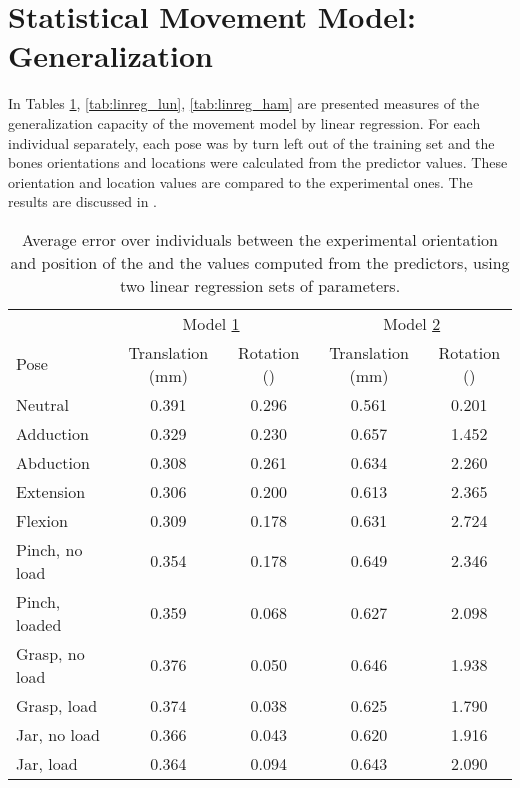\section{Statistical Movement Model: Generalization}
\label{appendix:movement_model_generalization}


In Tables \ref{tab:linreg_mc3}, \ref{tab:linreg_lun}, \ref{tab:linreg_ham} are presented measures of the generalization capacity of the movement model by linear regression. For each individual separately, each pose was by turn left out of the training set and the bones orientations and locations were calculated from the predictor values. These orientation and location values are compared to the experimental ones. The results are discussed in .

\begin{table}[!ht]
	\centering
	\begin{tabular}{lcc|cc}
		\toprule
		\mct*	& \multicolumn{2}{c}{Model \hyperref[model1]{1}} & \multicolumn{2}{c}{Model \hyperref[model2]{2}} \\
		Pose & Translation (mm) & Rotation (\degre) & Translation (mm) & Rotation (\degre) \\
		\midrule
		Neutral 		 & 0.391 	 & 0.296 	 & 0.561 	 & 0.201 \\
		Adduction 		 & 0.329 	 & 0.230 	 & 0.657 	 & 1.452 \\
		Abduction 		 & 0.308 	 & 0.261 	 & 0.634 	 & 2.260 \\
		Extension 		 & 0.306 	 & 0.200 	 & 0.613 	 & 2.365 \\
		Flexion 		 & 0.309 	 & 0.178 	 & 0.631 	 & 2.724 \\
		Pinch, no load 	 & 0.354 	 & 0.178 	 & 0.649 	 & 2.346 \\
		Pinch, loaded 	 & 0.359 	 & 0.068 	 & 0.627 	 & 2.098 \\
		Grasp, no load 	 & 0.376 	 & 0.050 	 & 0.646 	 & 1.938 \\
		Grasp, load 	 & 0.374 	 & 0.038 	 & 0.625 	 & 1.790 \\
		Jar, no load 	 & 0.366 	 & 0.043 	 & 0.620 	 & 1.916 \\
		Jar, load 		 & 0.364 	 & 0.094 	 & 0.643 	 & 2.090 \\
		\bottomrule
	\end{tabular}
	\caption[Generalization capacity of the statistical movement model for the \mct*]{Average error over individuals between the experimental orientation and position of the \mct* and the values computed from the predictors, using two linear regression sets of parameters.}
	\label{tab:linreg_mc3}
\end{table}


